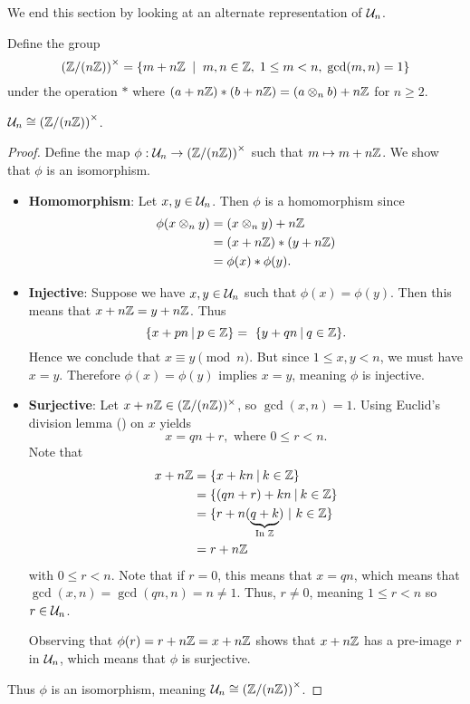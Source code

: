 We end this section by looking at an alternate representation of $\mathcal{U}_{n}$. 
\begin{definition}
    Define the group
    \[
        \left(\Z/(n\Z)\right)^{\times} = \left\{m + n\Z \ \vert \ m,n \in \Z,\; 1 \leq m < n,\; \gcd(m, n)=1\right\}
    \]
    under the operation $\ast$ where $(a+n\mathbb{Z})\ast(b+n\mathbb{Z}) = (a\otimes_n b) + n\mathbb{Z}$ for $n \geq 2$.
\end{definition}
\begin{proposition}
    $\mathcal{U}_{n} \cong \left(\mathbb{Z}/(n\mathbb{Z})\right)^{\times}$.
\end{proposition}
\begin{proof}
    Define the map $\phi: \mathcal{U}_{n} \to \left(\mathbb{Z}/(n\mathbb{Z})\right)^{\times}$ such that $m \mapsto m + n\mathbb{Z}$. We show that $\phi$ is an isomorphism.

    \begin{itemize}
        \item \textbf{Homomorphism}: Let $x, y \in \mathcal{U}_{n}$. Then $\phi$ is a homomorphism since
        \begin{align*}
            \phi(x \otimes_n y) &= (x \otimes_n y) + n\mathbb{Z}\\
            &= (x + n\mathbb{Z}) \ast (y + n\mathbb{Z})\\
            &= \phi(x) \ast \phi(y).
        \end{align*}

        \item \textbf{Injective}: Suppose we have $x, y \in \mathcal{U}_{n}$ such that $\phi(x) = \phi(y)$. Then this means that $x + n\mathbb{Z} = y + n\mathbb{Z}$. Thus
        \[
            \{x + pn \vert p \in \Z \} = \ \{y + qn \vert q \in \Z \}.
        \]
        Hence we conclude that $x \equiv y \pmod{n}$. But since $1 \leq x, y < n$, we must have $x = y$. Therefore $\phi(x) = \phi(y)$ implies $x = y$, meaning $\phi$ is injective.

        \item \textbf{Surjective}: Let $x + n\mathbb{Z} \in (\mathbb{Z}/(n\mathbb{Z}))^\times$, so $\gcd(x,n) = 1$. Using Euclid's division lemma () on $x$ yields
        \[
            x = qn + r, \text{ where } 0 \leq r < n.
        \]
        Note that
        \begin{align*}
            x + n\Z &= \{x + kn \vert k \in \Z\}\\
            &= \{(qn + r) + kn \vert k \in \Z\}\\
            &= \{r + n(\underbrace{q+k}_{\text{In } \Z}) \vertalt k \in \Z\}\\
            &= r + n\Z
        \end{align*}
        with $0 \leq r < n$. Note that if $r = 0$, this means that $x = qn$, which means that $\gcd(x, n) = \gcd(qn, n) = n \neq 1$. Thus, $r \neq 0$, meaning $1 \leq r < n$ so $r \in \mathcal{U}_{n}$.

        Observing that $\phi(r) = r + n\mathbb{Z} = x + n\mathbb{Z}$ shows that $x + n\mathbb{Z}$ has a pre-image $r$ in $\mathcal{U}_{n}$, which means that $\phi$ is surjective.
    \end{itemize}

    Thus $\phi$ is an isomorphism, meaning $\mathcal{U}_{n} \cong \left(\mathbb{Z}/(n\mathbb{Z})\right)^{\times}$.
\end{proof}

